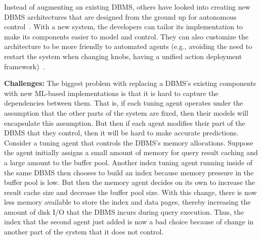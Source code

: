 \documentclass[11pt,times]{article}
\begin{document}
Instead of augmenting an existing DBMS, others have looked into creating new DBMS 
architectures that are designed from the ground up for autonomous 
control~\cite{pavlo17,sharma18,kraska19}.
With a new system, the developers can tailor its implementation to make its components 
easier to model and control. They can also customize the architecture to be more 
friendly to automated agents (e.g., avoiding the need to restart the system when changing knobs, 
having a unified action deployment framework)~\cite{pavlo19}.
\\ \vspace{-0.1in}

\textbf{Challenges:}
The biggest problem with replacing a DBMS's existing components with new ML-based implementations 
is that it is hard to capture the dependencies between them. That is, if each tuning agent 
operates under the assumption that the other parts of the system are fixed, then their
models will encapsulate this assumption. But then if each agent modifies their part of 
the DBMS that they control, then it will be hard to make accurate predictions. 
Consider a tuning agent that controls the DBMS's memory allocations. Suppose the 
agent initially assigns a small amount of memory for query result caching and a large amount to 
the buffer pool. Another index tuning agent running inside of the same DBMS then chooses to build 
an index because memory pressure 
in the buffer pool is low. But then the memory agent decides on its own to increase the result 
cache size and decrease the buffer pool size. With this change, there is now less memory available 
to store the index and data pages, thereby increasing the amount of disk I/O that the DBMS incurs 
during query execution. Thus, the index that the second agent just added is now a bad choice 
because of change in another part of the system that it does not control.
\end{document}
